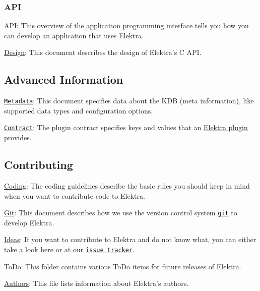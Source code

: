 \subsubsection*{A\+PI}


\begin{DoxyItemize}
\item A\+PI\+: This overview of the application programming interface tells you how you can develop an application that uses Elektra.
\item \hyperlink{doc_DESIGN_md}{Design}\+: This document describes the design of Elektra’s C A\+PI.
\end{DoxyItemize}

\subsection*{Advanced Information}


\begin{DoxyItemize}
\item \href{/home/markus/Projekte/Elektra/current/doc/METADATA.ini}{\tt Metadata}\+: This document specifies data about the K\+DB (meta information), like supported data types and configuration options.
\item \href{/home/markus/Projekte/Elektra/current/doc/CONTRACT.ini}{\tt Contract}\+: The plugin contract specifies keys and values that an \hyperlink{src_plugins_README_md}{Elektra plugin} provides.
\end{DoxyItemize}

\subsection*{Contributing}


\begin{DoxyItemize}
\item \hyperlink{doc_CODING_md}{Coding}\+: The coding guidelines describe the basic rules you should keep in mind when you want to contribute code to Elektra.
\item \hyperlink{doc_GIT_md}{Git}\+: This document describes how we use the version control system \href{https://git-scm.com}{\tt git} to develop Elektra.
\item \hyperlink{doc_IDEAS_md}{Ideas}\+: If you want to contribute to Elektra and do not know what, you can either take a look here or at our \href{http://libelektra.org/issues}{\tt issue tracker}.
\item To\+Do\+: This folder contains various To\+Do items for future releases of Elektra.
\item \hyperlink{doc_AUTHORS_md}{Authors}\+: This file lists information about Elektra’s authors.
\end{DoxyItemize}

